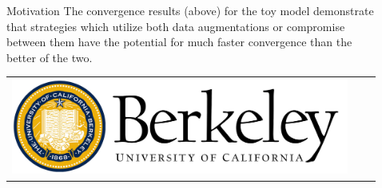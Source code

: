 \documentclass[final]{beamer}
\newlength{\sepwid}
\newlength{\onecolwid}
\newlength{\twocolwid}
\begin{document}
\begin{frame}[t]
\begin{columns}[t]
\begin{column}{\onecolwid}
\begin{block}{Motivation}
\vspace{.5em}
The convergence results (above) for the toy model demonstrate that strategies which utilize both data augmentations or compromise between them have the potential for much faster convergence than the better of the two. \vspace{1em}


\begin{center}
\begin{tabular}{ccc}
\includegraphics[width=0.5\linewidth]{logo.png} %
\end{tabular}
\end{center}


\end{block}




\end{column} %

\begin{column}{\sepwid}\end{column} %

\begin{column}{\twocolwid} %


\end{column}
\end{columns}
\end{frame}
\end{document}
